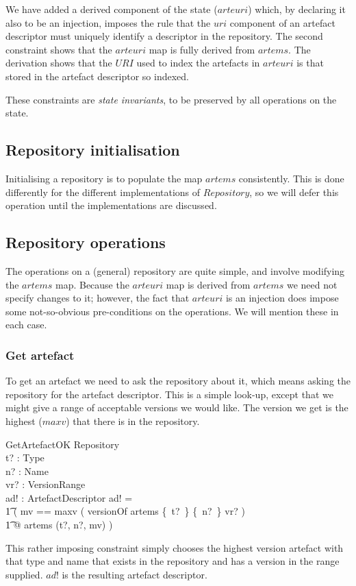 \documentclass[a4paper,titlepage,twoside,12pt]{article}
\begin{document}
We have added a derived component of the state ($arteuri$) which, by declaring it also to be an injection, imposes the rule that the $uri$ component of an artefact descriptor must uniquely identify a descriptor in the repository. The second constraint shows that the $arteuri$ map is fully derived from $artems$. The derivation shows that the $URI$ used to index the artefacts in $arteuri$ is that stored in the artefact descriptor so indexed.

These constraints are \emph{state invariants}, to be preserved by all operations on the state.

\subsection{Repository initialisation}
Initialising a repository is to populate the map $artems$ consistently. This is done differently for the different implementations of $Repository$, so we will defer this operation until the implementations are discussed.

\subsection{Repository operations}
The operations on a (general) repository are quite simple, and involve modifying the $artems$ map. Because the $arteuri$ map is derived from $artems$ we need not specify changes to it; however, the fact that $arteuri$ is an injection does impose some not-so-obvious pre-conditions on the operations. We will mention these in each case.

\subsubsection{Get artefact}
To get an artefact we need to ask the repository about it, which means asking the repository for the artefact descriptor. This is a simple look-up, except that we might give a range of acceptable versions we would like. The version we get is the highest ($maxv$) that there is in the repository.
\begin{schema}{GetArtefactOK}
	\Xi Repository	\\
	t? : Type		\\
	n? : Name	\\
	vr? : VersionRange	\\
	ad! : ArtefactDescriptor
\where
	ad! =	\\
	\t1 ( \LET mv ==  maxv ( versionOf \limg artems \limg \{~t?~\} \cross \{~n?~\} \cross vr? \rimg \rimg )\\
	\t1 @	artems (t?, n?, mv)  )
\end{schema}
This rather imposing constraint simply chooses the highest version artefact with that type and name that exists in the repository and has a version in the range supplied. $ad!$ is the resulting artefact descriptor.
\end{document}
